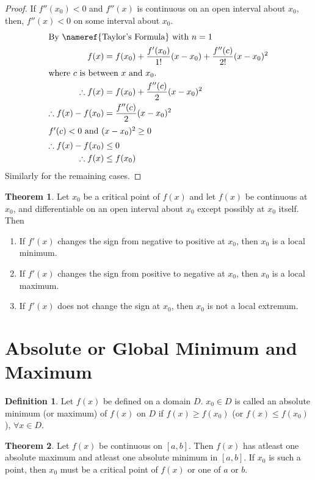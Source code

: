 \documentclass[fleqn]{article}
\theoremstyle{definition}
\newtheorem{definition}{Definition}
\theoremstyle{theorem}
\newtheorem{theorem}{Theorem}
\theoremstyle{remark}
\begin{document}
\begin{proof}
	If $f''(x_0) < 0$ and $f''(x)$ is continuous on an open interval about $x_0$, then, $f''(x) < 0$ on some interval about $x_0$.
	\begin{align*}
		\intertext{By \nameref{Taylor's Formula} with $n=1$}
		f(x) &= f(x_0) + \dfrac{f'(x_0)}{1!} (x - x_0) + \dfrac{f''(c)}{2!} (x - x_0)^2 \\
		\intertext{where $c$ is between $x$ and $x_0$.}
		\therefore f(x) &= f(x_0) + \dfrac{f''(c)}{2} (x - x_0)^2 \\
		\therefore f(x) - f(x_0) &= \dfrac{f''(c)}{2} (x - x_0)^2 \\
		\intertext{$f'(c) < 0$ and $(x - x_0)^2 \geq 0$}
		\therefore f(x) - f(x_0) &\leq 0 \\
		\therefore f(x) &\leq f(x_0)
	\end{align*}
	Similarly for the remaining cases.
\end{proof}

\begin{theorem}
	Let $x_0$ be a critical point of $f(x)$ and let $f(x)$ be continuous at $x_0$, and differentiable on an open interval about $x_0$ except possibly at $x_0$ itself. Then 
	\begin{enumerate}
		\item If $f'(x)$ changes the sign from negative to positive at $x_0$, then $x_0$ is a local minimum.
		\item If $f'(x)$ changes the sign from positive to negative at $x_0$, then $x_0$ is a local maximum.
		\item If $f'(x)$ does not change the sign at $x_0$, then $x_0$ is not a local extremum.
	\end{enumerate}
\end{theorem}

\section{Absolute or Global Minimum and Maximum}

\begin{definition}
	Let $f(x)$ be defined on a domain $D$. $x_0 \in D$ is called an absolute minimum (or maximum) of $f(x)$ on $D$ if $f(x) \geq f(x_0)$ (or $f(x) \leq f(x_0)$), $\forall x \in D$.
\end{definition}

\begin{theorem}
	Let $f(x)$ be continuous on $[a, b]$. Then $f(x)$ has atleast one absolute maximum and atleast one absolute minimum in $[a, b]$. If $x_0$ is such a point, then $x_0$ must be a critical point of $f(x)$ or one of $a$ or $b$.
\end{theorem}
\end{document}
